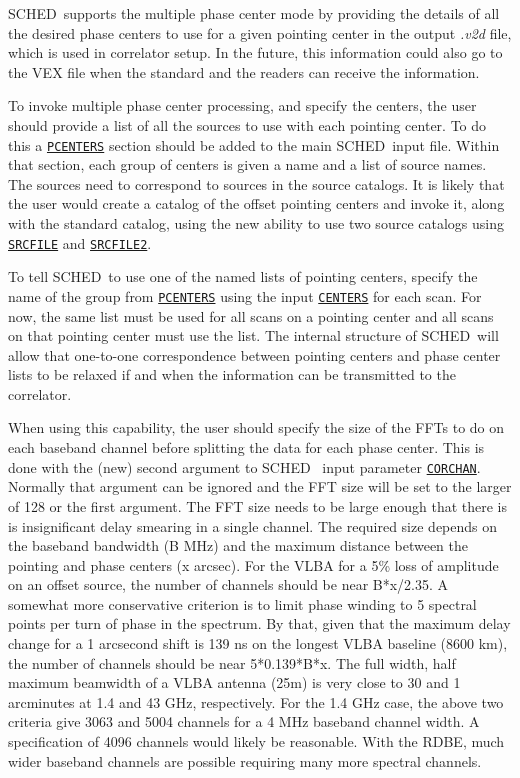 \documentclass{report}
\newcommand{\schedb}{{\sc SCHED~}}
\begin{document}
\schedb supports the multiple phase center mode by providing the
details of all the desired phase centers to use for a given pointing
center in the output {\sl .v2d} file, which is used in correlator
setup.  In the future, this information could also go to the VEX file
when the standard and the readers can receive the information.

To invoke multiple phase center processing, and specify the centers,
the user should provide a list of all the sources to use with each
pointing center.  To do this a 
{\hyperref[MP:PCENTERS]{{\tt PCENTERS}}}
section should be added to the main \schedb input file.  Within that
section, each group of centers is given a name and a list of source
names.  The sources need to correspond to sources in the source
catalogs.  It is likely that the user would create a catalog of the
offset pointing centers and invoke it, along with the standard
catalog, using the new ability to use two source catalogs using
{\hyperref[MP:SRCFILE]{{\tt SRCFILE}}} and 
{\hyperref[MP:SRCFILE2]{{\tt SRCFILE2}}}.

To tell \schedb to use one of the named lists of pointing centers,
specify the name of the group from 
{\hyperref[MP:PCENTERS]{{\tt PCENTERS}}} using the input 
{\hyperref[MP:CENTERS]{{\tt CENTERS}}}
for each scan.  For now, the same list must be
used for all scans on a pointing center and all scans on that pointing
center must use the list.  The internal structure of \schedb will
allow that one-to-one correspondence between pointing centers and
phase center lists to be relaxed if and when the information can
be transmitted to the correlator.

When using this capability, the user should specify the size of the
FFTs to do on each baseband channel before splitting the data for each
phase center.  This is done with the (new) second argument to \schedb
input parameter 
{\hyperref[MP:CORCHAN]{{\tt CORCHAN}}}.  Normally that
argument can be ignored and the FFT size will be set to the larger of
128 or the first argument.  The FFT size needs to be large enough that
there is is insignificant delay smearing in a single channel.  The
required size depends on the baseband bandwidth (B MHz) and the
maximum distance between the pointing and phase centers (x arcsec).
For the VLBA for a 5\% loss of amplitude on an offset source, the
number of channels should be near B*x/2.35.  A somewhat more
conservative criterion is to limit phase winding to 5 spectral points
per turn of phase in the spectrum.  By that, given that the maximum
delay change for a 1 arcsecond shift is 139 ns on the longest VLBA
baseline (8600 km), the number of channels should be near 5*0.139*B*x.
The full width, half maximum beamwidth of a VLBA antenna (25m) is very
close to 30 and 1 arcminutes at 1.4 and 43 GHz, respectively.  For the
1.4 GHz case, the above two criteria give 3063 and 5004 channels for a
4 MHz baseband channel width.  A specification of 4096 channels would
likely be reasonable.  With the RDBE, much wider baseband channels 
are possible requiring many more spectral channels.
\end{document}
